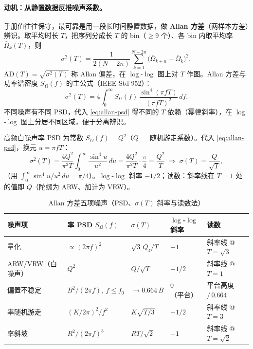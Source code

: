 \paragraph{动机：从静置数据反推噪声系数。}
手册值往往保守，最可靠是用一段长时间静置数据，做 \textbf{Allan 方差}（两样本方差）辨识\cite{woodman2007inertial}。取平均时长 $T$，把序列分成长 $T$ 的 bin（$\ge9$ 个）、各 bin 内取平均率 $\bar\Omega_k(T)$，则
\begin{equation}
  \sigma^2(T)=\frac{1}{2(N-2n)}\sum_{k=1}^{N-2n}\big(\bar\Omega_{k+n}-\bar\Omega_k\big)^2,
  \label{eq:allan-def}
\end{equation}
$\mathrm{AD}(T)=\sqrt{\sigma^2(T)}$ 称 Allan 偏差，在 $\log$-$\log$ 图上对 $T$ 作图。Allan 方差与功率谱密度 $S_\Omega(f)$ 的主公式（IEEE Std 952）：
\begin{equation}
  \sigma^2(T)=4\int_0^\infty S_\Omega(f)\,\frac{\sin^4(\pi fT)}{(\pi fT)^2}\,df.
  \label{eq:allan-psd}
\end{equation}
不同噪声有不同 PSD，代入 \cref{eq:allan-psd} 得不同的 $T$ 依赖（幂律斜率），在 $\log$-$\log$ 图上分居不同区域，便于分离辨识。

\begin{derivation}[角度随机游走项：从 PSD 到 $\sigma(T)=Q/\sqrt T$]
高频白噪声率 PSD 为常数 $S_\Omega(f)=Q^2$（$Q=$ 随机游走系数）。代入 \cref{eq:allan-psd}，换元 $u=\pi fT$：
\[
  \sigma^2(T)=\frac{4Q^2}{\pi^2T}\int_0^\infty\frac{\sin^4 u}{u^2}\,du=\frac{4Q^2}{\pi^2T}\cdot\frac{\pi}{4}=\frac{Q^2}{T}
  \;\Rightarrow\;\sigma(T)=\frac{Q}{\sqrt T},
\]
（用 $\int_0^\infty\sin^4u/u^2\,du=\pi/4$）。$\log$-$\log$ 斜率 $-1/2$；读数：斜率线在 $T=1$ 处的值即 $Q$（陀螺为 ARW、加计为 VRW）。
\end{derivation}

\begin{table}[H]\centering\small
\caption{Allan 方差五项噪声（PSD、$\sigma(T)$ 斜率与读数法\cite{woodman2007inertial}）}
\label{tab:allan-five}
\begin{tabular}{lllll}
\toprule
噪声项 & 率 PSD $S_\Omega(f)$ & $\sigma(T)$ & $\log$-$\log$ 斜率 & 读数 \\
\midrule
量化 & $\propto(2\pi f)^2$ & $\sqrt3\,Q_z/T$ & $-1$ & 斜率线 @ $T=\sqrt3$ \\
ARW/VRW（白噪声） & $Q^2$ & $Q/\sqrt T$ & $-1/2$ & 斜率线 @ $T=1$ \\
偏置不稳定 & $B^2/(2\pi f),\ f\le f_0$ & $\to0.664\,B$ & $0$（平台） & 平台高度 $/\,0.664$ \\
率随机游走 & $(K/2\pi)^2/f^2$ & $K\sqrt{T/3}$ & $+1/2$ & 斜率线 @ $T=3$ \\
率斜坡 & $R^2/(2\pi f)^3$ & $RT/\sqrt2$ & $+1$ & 斜率线 @ $T=\sqrt2$ \\
\bottomrule
\end{tabular}
\end{table}

